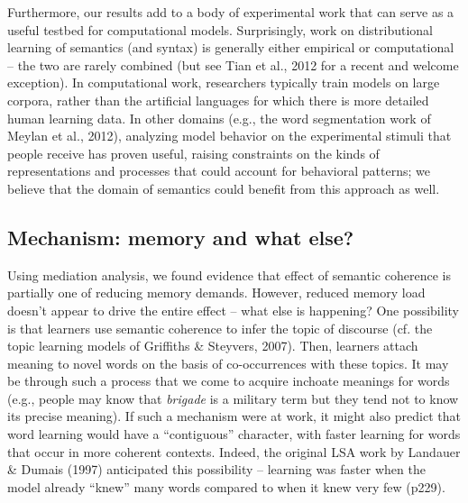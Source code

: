 \documentclass[man,floatsintext]{apa6}
\begin{document}
Furthermore, our results add to a body of experimental work that can
serve as a useful testbed for computational models. Surprisingly, work
on distributional learning of semantics (and syntax) is generally
either empirical or computational -- the two are rarely combined (but
see Tian et al., 2012 for a recent and welcome exception).  In
computational work, researchers typically train models on large
corpora, rather than the artificial languages for which there is more
detailed human learning data. In other domains (e.g., the word
segmentation work of Meylan et al., 2012), analyzing model behavior on
the experimental stimuli that people receive has proven useful,
raising constraints on the kinds of representations and processes that
could account for behavioral patterns; we believe that the domain of
semantics could benefit from this approach as well.


\subsection{Mechanism: memory and what else?}

Using mediation analysis, we found evidence that effect of semantic
coherence is partially one of reducing memory demands. However,
reduced memory load doesn't appear to drive the entire effect -- what
else is happening? One possibility is that learners use semantic
coherence to infer the topic of discourse (cf. the topic learning
models of Griffiths \& Steyvers, 2007). Then, learners attach meaning
to novel words on the basis of co-occurrences with these topics. It
may be through such a process that we come to acquire inchoate
meanings for words (e.g., people may know that \emph{brigade} is a
military term but they tend not to know its precise meaning). If such
a mechanism were at work, it might also predict that word learning
would have a ``contiguous'' character, with faster learning for words
that occur in more coherent contexts. Indeed, the original LSA work by
Landauer \& Dumais (1997) anticipated this possibility -- learning was
faster when the model already ``knew'' many words compared to when it
knew very few (p229).


\nocite{*} \newpage 

\end{document}
